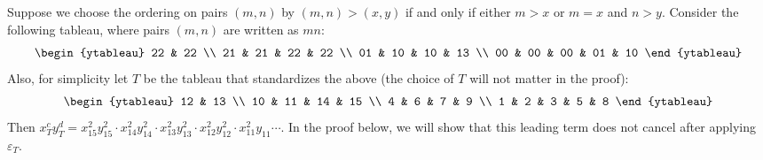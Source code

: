 \documentclass[ALCO,Unicode]{cedram}
\begin{document}
\begin{example}\label{ex:horz-strips}
	Suppose we choose the ordering on pairs $(m,n)$ by $(m,n)>(x,y)$ if and only if either $m>x$ or $m=x$ and $n>y$.  Consider the following tableau, where pairs $(m,n)$ are written as $mn$:
	$$\begin{ytableau}
	22 & 22 \\
	21 & 21 & 22 & 22 \\
	01 & 10 & 10 & 13 \\
	00 & 00 & 00 & 01 & 10
	\end{ytableau}$$
	Also, for simplicity let $T$ be the tableau that standardizes the above (the choice of $T$ will not matter in the proof): 
	$$\begin{ytableau}
	12 & 13 \\ 
	10 & 11 & 14 & 15 \\
	4 &  6 & 7  & 9 \\
	1 & 2 & 3 & 5 & 8
	\end{ytableau}$$
	Then $x_T^c y_T^d=x_{15}^2 y_{15}^2 \cdot x_{14}^2y_{14}^2\cdot x_{13}^2y_{13}^2\cdot x_{12}^2y_{12}^2\cdot x_{11}^2y_{11}\cdots $.  In the proof below, we will show that this leading term does not cancel after applying $\varepsilon_T$.
\end{example}
\end{document}
